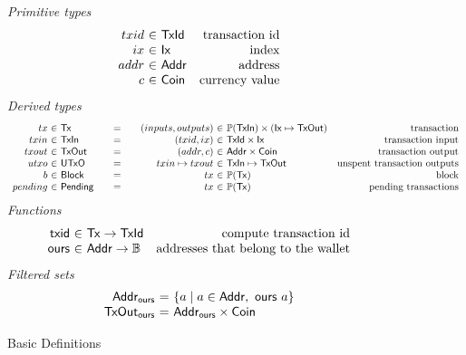 \documentclass{article}
\newcommand{\powerset}[1]{\mathbb{P}(#1)}
\theoremstyle{definition}{
  \newtheorem{lemma}{Lemma}[section] %
  \newtheorem{definition}[lemma]{Definition}
}
\theoremstyle{theorem}{
  \newtheorem{invariant}[lemma]{Invariant}
  \newtheorem{proofobligation}[lemma]{Proof Obligation}
}
\numberwithin{equation}{lemma}
\begin{document}
\begin{figure}

\emph{Primitive types}
%
\begin{equation*}
\begin{array}{r@{~\in~}lr}
  txid
& \mathsf{TxId}
& \text{transaction id}
\\
  ix
& \mathsf{Ix}
& \text{index}
\\
  addr
& \mathsf{Addr}
& \text{address}
\\
  c
& \mathsf{Coin}
& \text{currency value}
\end{array}
\end{equation*}
%
\emph{Derived types}
%
\begin{equation*}
\begin{array}{r@{~\in~}l@{\qquad=\qquad}r@{~\in~}lr}
  tx
& \mathsf{Tx}
& (inputs, outputs)
& \powerset{\mathsf{TxIn}} \times (\mathsf{Ix} \mapsto \mathsf{TxOut})
& \text{transaction}
\\
  txin
& \mathsf{TxIn}
& (txid, ix)
& \mathsf{TxId} \times \mathsf{Ix}
& \text{transaction input}
\\
  txout
& \mathsf{TxOut}
& (addr, c)
& \mathsf{Addr} \times \mathsf{Coin}
& \text{transaction output}
\\
  utxo
& \mathsf{UTxO}
& txin \mapsto txout
& \mathsf{TxIn} \mapsto \mathsf{TxOut}
& \text{unspent transaction outputs}
\\
  b
& \mathsf{Block}
& tx
& \powerset{\mathsf{Tx}}
& \text{block}
\\
  pending
& \mathsf{Pending}
& tx
& \powerset{\mathsf{Tx}}
& \text{pending transactions}
\end{array}
\end{equation*}
%
\emph{Functions}
%
\begin{equation*}
\begin{array}{r@{~\in~}lr}
  \mathsf{txid}
& \mathsf{Tx} \to \mathsf{TxId}
& \text{compute transaction id}
\\
  \mathsf{ours}
& \mathsf{Addr} \to \mathbb{B}
& \text{addresses that belong to the wallet}
\end{array}
\end{equation*}
%
\emph{Filtered sets}
%
\begin{equation*}
\begin{array}{r@{~=~}lr}
  \mathsf{Addr_{ours}}
& \{ a \mid a \in \mathsf{Addr}, ~ \mathsf{ours} ~ a \}
\\
  \mathsf{TxOut_{ours}}
& \mathsf{Addr_{ours}} \times \mathsf{Coin}
\end{array}
\end{equation*}

\caption{\label{fig:basic_definitions}Basic Definitions}
\end{figure}
\end{document}
